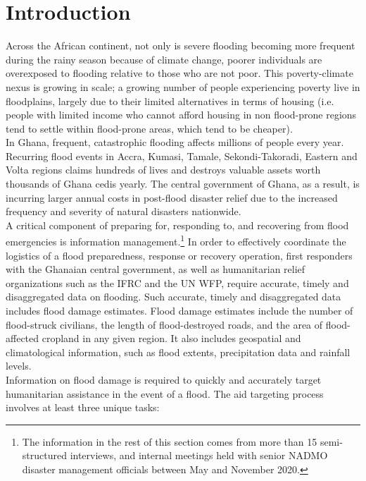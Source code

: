 \chapter{Introduction}

Across the African continent, not only is severe flooding becoming more frequent during the rainy season because of climate change, poorer individuals are overexposed to flooding relative to those who are not poor.\cite{douglas2008unjust} This poverty-climate nexus is growing in scale; a growing number of people experiencing poverty live in floodplains, largely due to their limited alternatives in terms of housing\cite{abubakari2019cities} (i.e. people with limited income who cannot afford housing in non flood-prone regions tend to settle within flood-prone areas, which tend to be cheaper).\cite{mensah2020causes}\\

In Ghana, frequent, catastrophic flooding affects millions of people every year. Recurring flood events in Accra, Kumasi, Tamale, Sekondi-Takoradi, Eastern and Volta regions claims hundreds of lives and destroys valuable assets worth thousands of Ghana cedis yearly.\cite{abubakari2019cities} The central government of Ghana, as a result, is incurring larger annual costs in post-flood disaster relief due to the increased frequency and severity of natural disasters nationwide.\\

A critical component of preparing for, responding to, and recovering from flood emergencies is information management.\footnote{The information in the rest of this section comes from more than 15 semi-structured interviews, and internal meetings held with senior NADMO disaster management officials between May and November 2020.} In order to effectively coordinate the logistics of a flood preparedness, response or recovery operation, first responders with the Ghanaian central government, as well as humanitarian relief organizations such as the IFRC and the UN WFP, require accurate, timely and disaggregated data on flooding. Such accurate, timely and disaggregated data includes flood damage estimates. Flood damage estimates include the number of flood-struck civilians, the length of flood-destroyed roads, and the area of flood-affected cropland in any given region. It also includes geospatial and climatological information, such as flood extents, precipitation data and rainfall levels.\\

Information on flood damage is required to quickly and accurately target humanitarian assistance in the event of a flood. The aid targeting process involves at least three unique tasks: 

